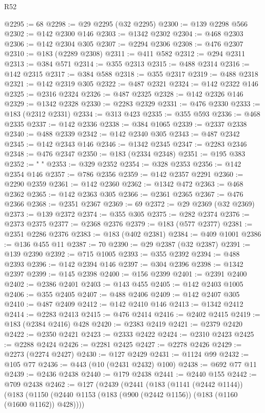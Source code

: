 \begin{lexlean}{R52}
\begin{coremodule}
@2295 := 68
@2298 := @29 @2295 (@32 @2295)
@2300 := @139 @2298 @566
@2302 := @142 @2300 @146
@2303 := @1342 @2302
@2304 := @468 @2303
@2306 := @142 @2304 @305
@2307 := @2294 @2306
@2308 := @476 @2307
@2310 := @183 (@2289 @2308)
@2311 := @411 @582
@2312 := @294 @2311
@2313 := @384 @571
@2314 := @355 @2313
@2315 := @488 @2314
@2316 := @142 @2315
@2317 := @384 @588
@2318 := @355 @2317
@2319 := @488 @2318
@2321 := @142 @2319 @305
@2322 := @487 @2321
@2324 := @142 @2322 @146
@2325 := @2316 @2324
@2326 := @487 @2325
@2328 := @142 @2326 @146
@2329 := @1342 @2328
@2330 := @2283 @2329
@2331 := @476 @2330
@2333 := @183 (@2312 @2331)
@2334 := @313 @423
@2335 := @355 @593
@2336 := @468 @2335
@2337 := @142 @2336
@2338 := @384 @1065
@2339 := @2337 @2338
@2340 := @488 @2339
@2342 := @142 @2340 @305
@2343 := @487 @2342
@2345 := @142 @2343 @146
@2346 := @1342 @2345
@2347 := @2283 @2346
@2348 := @476 @2347
@2350 := @183 (@2334 @2348)
@2351 := @195 @383
@2352 := " "
@2353 := @329 @2352
@2354 := @328 @2353
@2356 := @142 @2354 @146
@2357 := @786 @2356
@2359 := @142 @2357 @2291
@2360 := @2290 @2359
@2361 := @142 @2360
@2362 := @1342 @472
@2363 := @468 @2362
@2365 := @142 @2363 @305
@2366 := @2361 @2365
@2367 := @476 @2366
@2368 := @2351 @2367
@2369 := 69
@2372 := @29 @2369 (@32 @2369)
@2373 := @139 @2372
@2374 := @355 @305
@2375 := @282 @2374
@2376 := @2373 @2375
@2377 := @2368 @2376
@2379 := @183 (@577 @2377)
@2381 := @2351 @2286 @2376
@2383 := @183 (@402 @2381)
@2384 := @409 @1001
@2386 := @136 @455 @11
@2387 := 70
@2390 := @29 @2387 (@32 @2387)
@2391 := @139 @2390
@2392 := @715 @1005
@2393 := @355 @2392
@2394 := @488 @2393
@2396 := @142 @2394 @146
@2397 := @304 @2396
@2398 := @1342 @2397
@2399 := @145 @2398
@2400 := @156 @2399
@2401 := @2391 @2400
@2402 := @2386 @2401
@2403 := @143 @455
@2405 := @142 @2403 @1005
@2406 := @355 @2405
@2407 := @488 @2406
@2409 := @142 @2407 @305
@2410 := @487 @2409
@2412 := @142 @2410 @146
@2413 := @1342 @2412
@2414 := @2283 @2413
@2415 := @476 @2414
@2416 := @2402 @2415
@2419 := @183 (@2384 @2416) @428
@2420 := @2383 @2419
@2421 := @2379 @2420
@2422 := @2350 @2421
@2423 := @2333 @2422
@2424 := @2310 @2423
@2425 := @2288 @2424
@2426 := @2281 @2425
@2427 := @2278 @2426
@2429 := @2273 (@2274 @2427)
@2430 := @127 @2429
@2431 := @1124 @99
@2432 := @105 @77
@2436 := @443 (@10 (@2431 @2432) @100)
@2438 := @692 @77 @11
@2439 := @2436 @2438
@2440 := @179 @2438
@2441 := @2440 @155
@2442 := @709 @2438
@2462 := @127
    (@2439
      (@2441
        (@183
          (@1141 (@2442 @1144))
          (@183
            (@1150 (@2440 @1153 (@183 (@900 (@2442 @1156)) (@183 (@1160 (@1600 @1162)) @428))))

\end{coremodule}
\end{lexlean}
